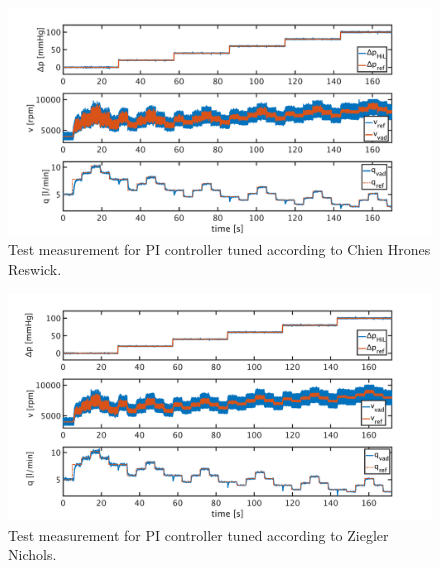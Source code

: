 \begin{figure}[ht!]
  \centering
  \includegraphics[width=\textwidth]{images/chapt_5/pi_contr_chr.pdf}
  \caption[Test measurement for PI controller tuned according to Chien Hrones Reswick]{Test measurement for PI controller tuned according to Chien Hrones Reswick.}
  \label{fig:anh_6}
\end{figure}

\begin{figure}[ht!]
  \centering
  \includegraphics[width=\textwidth]{images/chapt_5/pi_contr_zn.pdf}
  \caption[Test measurement for PI controller tuned according to Ziegler Nichols]{Test measurement for PI controller tuned according to Ziegler Nichols.}
  \label{fig:anh_7}
\end{figure}

